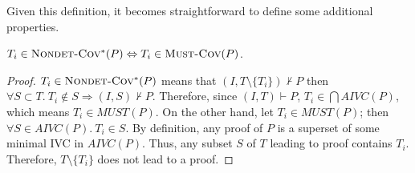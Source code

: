%

\noindent Given this definition, it becomes straightforward to define some additional properties.

\begin{lemma}
  \label{lem:must-coverage}
$T_i \in \text{\sc Nondet-Cov$^{*}$} (P) \Leftrightarrow T_i \in \text{\sc Must-Cov}(P)$.
\end{lemma}
\begin{proof}
$T_i \in \text{\sc Nondet-Cov$^{*}$} (P)$ means that $(I, T \setminus \{ T_i \}) \nvdash P$ then
$\forall S \subset T .~ T_i \notin S \Rightarrow (I, S) \nvdash P$.
Therefore, since $(I, T) \vdash P$, $T_i \in \bigcap AIVC(P)$, which means  $T_i \in MUST(P)$.
On the other hand, let $T_i \in MUST(P)$; then $\forall S \in AIVC(P).~ T_i \in S$.
By definition, any proof of $P$ is a superset of some minimal IVC in $AIVC(P)$.
Thus, any subset $S$ of $T$ leading to proof contains $T_i$.
Therefore, $T \setminus \{ T_i \}$ does not lead to a proof.
\end{proof}
\vspace{2mm}

